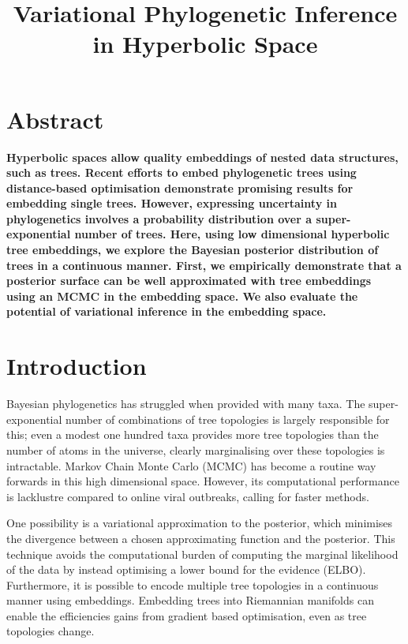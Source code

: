 \documentclass[11pt, twocolumn]{article}
\title{Variational Phylogenetic Inference in Hyperbolic Space}
\begin{document}
\maketitle

\section{Abstract}
\textbf{
Hyperbolic spaces allow quality embeddings of nested data structures, such as trees.
Recent efforts to embed phylogenetic trees using distance-based optimisation demonstrate promising results for embedding single trees.
However, expressing uncertainty in phylogenetics involves a probability distribution over a super-exponential number of trees.
Here, using low dimensional hyperbolic tree embeddings, we explore the Bayesian posterior distribution of trees in a continuous manner.
First, we empirically demonstrate that a posterior surface can be well approximated with tree embeddings using an MCMC in the embedding space.
We also evaluate the potential of variational inference in the embedding space.
}

\section{Introduction}
Bayesian phylogenetics has struggled when provided with many taxa.
The super-exponential number of combinations of tree topologies is largely responsible for this;
even a modest one hundred taxa provides more tree topologies than the number of atoms in the universe, clearly marginalising over these topologies is intractable.
Markov Chain Monte Carlo (MCMC) has become a routine way forwards in this high dimensional space.
However, its computational performance is lacklustre compared to online viral outbreaks, calling for faster methods.

One possibility is a variational approximation to the posterior, which minimises the divergence between a chosen approximating function and the posterior.
This technique avoids the computational burden of computing the marginal likelihood of the data by instead optimising a lower bound for the evidence (ELBO).
Furthermore, it is possible to encode multiple tree topologies in a continuous manner using embeddings.
Embedding trees into Riemannian manifolds can enable the efficiencies gains from gradient based optimisation, even as tree topologies change.
\end{document}

